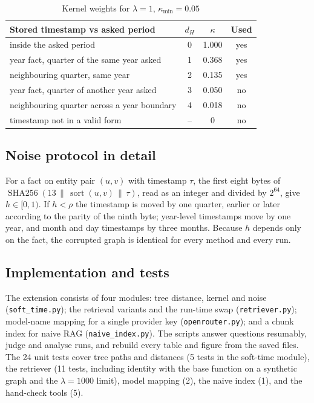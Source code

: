 \begin{table}[t]
\centering
\caption{Kernel weights for $\lambda = 1$, $\kappa_{\min} = 0.05$}
\label{tab:weights}
\begin{tabular}{lccc}
\toprule
Stored timestamp vs asked period & $d_H$ & $\kappa$ & Used \\
\midrule
inside the asked period & 0 & 1.000 & yes \\
year fact, quarter of the same year asked & 1 & 0.368 & yes \\
neighbouring quarter, same year & 2 & 0.135 & yes \\
year fact, quarter of another year asked & 3 & 0.050 & no \\
neighbouring quarter across a year boundary & 4 & 0.018 & no \\
timestamp not in a valid form & -- & 0 & no \\
\bottomrule
\end{tabular}
\end{table}

\ifextended
\subsection{Noise protocol in detail}
For a fact on entity pair $(u, v)$ with timestamp $\tau$, the first eight bytes of $\operatorname{SHA256}(13 \,\|\, \operatorname{sort}(u, v) \,\|\, \tau)$, read as an integer and divided by $2^{64}$, give $h \in [0, 1)$. If $h < \rho$ the timestamp is moved by one quarter, earlier or later according to the parity of the ninth byte; year-level timestamps move by one year, and month and day timestamps by three months. Because $h$ depends only on the fact, the corrupted graph is identical for every method and every run.

\subsection{Implementation and tests}
The extension consists of four modules: tree distance, kernel and noise (\texttt{soft\_time.py}); the retrieval variants and the run-time swap (\texttt{retriever.py}); model-name mapping for a single provider key (\texttt{openrouter.py}); and a chunk index for naive RAG (\texttt{naive\_index.py}). The scripts answer questions resumably, judge and analyse runs, and rebuild every table and figure from the saved files. The 24 unit tests cover tree paths and distances (5 tests in the soft-time module), the retriever (11 tests, including identity with the base function on a synthetic graph and the $\lambda = 1000$ limit), model mapping (2), the naive index (1), and the hand-check tools (5).

